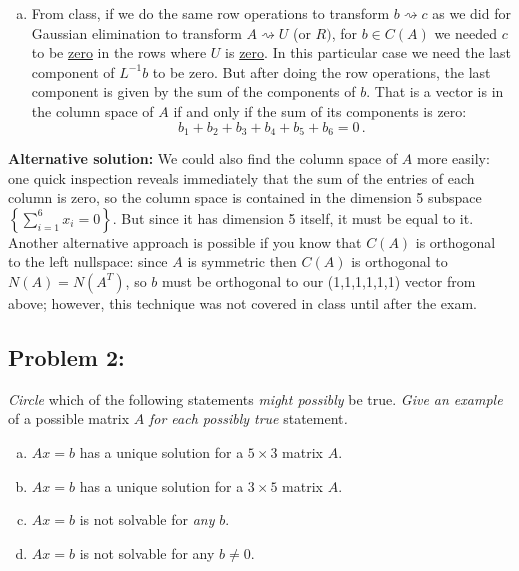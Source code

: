 \documentclass{article}
\begin{document}
\begin{enumerate}[(a)]
\[\begin{array}{cccccc}
 &   &  &   &   &  0
\end{array}\right)\,.
\]
From the free column, we can read off the same (1,1,1,1,1,1) nullspace vector as above.
\item From class, if we do the same row operations to transform
$b\rightsquigarrow c$ as we did for Gaussian elimination to transform
$A\rightsquigarrow U$ (or $R)$, for $b\in C(A)$ we needed $c$
to be \underline{zero} in the rows where $U$ is \underline{zero}. In this particular case we need the last component of $L^{-1}b$ to be zero. But after doing the row operations, the last component is given by the sum of the components of $b$. That is a vector is in the column space of $A$ if and only if the sum of its components is zero:
\[b_1+b_2+b_3+b_4+b_5+b_6=0\,.\]
\end{enumerate}

\textbf{Alternative solution:} We could also find the column space of $A$ more easily: one quick inspection reveals immediately that the sum of the entries of each column is zero, so the column space is contained in the dimension 5 subspace $\left\{\sum_{i=1}^6x_i=0\right\}$. But since it has dimension 5 itself, it must be equal to it.  Another alternative approach is possible if you know that $C(A)$ is orthogonal to the left nullspace: since $A$ is symmetric then $C(A)$ is orthogonal to $N(A)=N(A^T)$, so $b$ must be orthogonal to our (1,1,1,1,1,1) vector from above; however, this technique was not covered in class until after the exam.

\subsection*{Problem 2:}

\emph{Circle} which of the following statements \emph{might possibly}
be true. \emph{Give an example} of a possible matrix $A$ \emph{for
each possibly true }statement\emph{.}
\begin{enumerate}[(a)]
\item $Ax=b$ has a unique solution for a $5\times3$ matrix $A$.
\item $Ax=b$ has a unique solution for a $3\times5$ matrix $A$.
\item $Ax=b$ is not solvable for \emph{any} $b$.
\item $Ax=b$ is not solvable for any $b\ne0$.
\end{enumerate}
\end{document}
